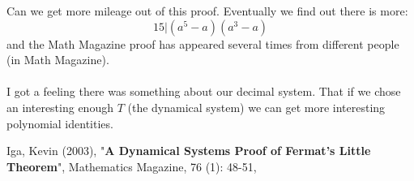 \documentclass[12pt]{article}
\begin{document}
\newpage

\noindent Can we get more mileage out of this proof.  Eventually we find out there is more:
$$ 15 \big| (a^5 - a)(a^3 - a) $$
and the Math Magazine proof has appeared several times from different people (in Math Magazine). \\ \\
I got a feeling there was something about our decimal system.  That if we chose an interesting enough $T$ (the dynamical system) we can get more interesting polynomial identities.

\newpage

\selectfont \fontsize{12}{10}\selectfont

\begin{thebibliography}{}

\item Iga, Kevin (2003), "\textbf{A Dynamical Systems Proof of Fermat's Little Theorem}", Mathematics Magazine, 76 (1): 48-51,


\end{thebibliography}
\end{document}
